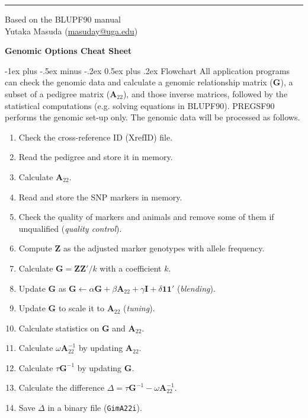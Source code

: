 \documentclass[10pt,landscape]{article}
\makeatletter
\renewcommand{\section}{\@startsection{section}{1}{0mm}%
                                {-1ex plus -.5ex minus -.2ex}%
                                {0.5ex plus .2ex}%
                                {\normalfont\large\bfseries}}
\makeatother
\begin{document}
\begin{multicols}{3}
\rule{0.3\linewidth}{0.25pt}
\scriptsize

Based on the BLUPF90 manual\\
Yutaka Masuda (\href{mailto:masuday@uga.edu}{masuday@uga.edu})

\clearpage
\footnotesize

\begin{center}
     \Large{\textbf{Genomic Options Cheat Sheet}} \\
\end{center}

\section{Flowchart}
All application programs can check the genomic data and calculate a genomic relationship matrix ($\mathbf{G}$), a subset of a pedigree matrix ($\mathbf{A}_{22}$), and those inverse matrices, followed by the statistical computations (e.g. solving equations in BLUPF90).
PREGSF90 performs the genomic set-up only.
The genomic data will be processed as follows.

\begin{enumerate}[leftmargin=*,itemsep=0pt,parsep=0pt]
  \item Check the cross-reference ID (XrefID) file.
  \item Read the pedigree and store it in memory.
  \item Calculate $\mathbf{A}_{22}$.
  \item Read and store the SNP markers in memory.
  \item Check the quality of markers and animals and remove some of them if unqualified (\emph{quality control}).
  \item Compute $\mathbf{Z}$ as the adjusted marker genotypes with allele frequency.
  \item Calculate $\mathbf{G}=\mathbf{ZZ}'/k$ with a coefficient $k$.
  \item Update $\mathbf{G}$ as $\mathbf{G}\leftarrow\alpha\mathbf{G}+\beta\mathbf{A}_{22}+\gamma\mathbf{I}+\delta\mathbf{11}'$ (\emph{blending}).
  \item Update $\mathbf{G}$ to scale it to $\mathbf{A}_{22}$ (\emph{tuning}).
  \item Calculate statistics on $\mathbf{G}$ and $\mathbf{A}_{22}$.
  \item Calculate $\omega\mathbf{A}_{22}^{-1}$ by updating $\mathbf{A}_{22}$.
  \item Calculate $\tau\mathbf{G}^{-1}$ by updating $\mathbf{G}$.
  \item Calculate the difference $\Delta=\tau\mathbf{G}^{-1}-\omega\mathbf{A}_{22}^{-1}$.
  \item Save $\Delta$ in a binary file (\verb|GimA22i|).
\end{enumerate}


\end{multicols}
\end{document}
